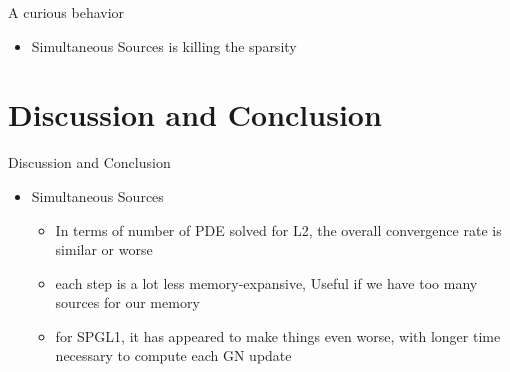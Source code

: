 \documentclass[12pt]{beamer}
\begin{document}
\begin{frame}{A curious behavior}
\begin{itemize}
  \item Simultaneous Sources is killing the sparsity
\end{itemize}
\begin{figure}
\end{figure}

\end{frame}


\section{Discussion and Conclusion}

\begin{frame}{Discussion and Conclusion}
\begin{itemize}
  \item Simultaneous Sources
  \vspace{10pt}
  \begin{itemize}
    \item In terms of number of PDE solved for L2, the overall convergence rate is similar or worse
    \vspace{10pt}
    \item each step is a lot less memory-expansive, Useful if we have too many sources for our memory
    \vspace{10pt}
    \item for SPGL1, it has appeared to make things even worse, with longer time necessary to compute each GN update
  \end{itemize}
\end{itemize}
\end{frame}
\end{document}
